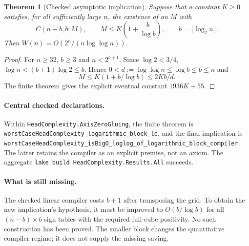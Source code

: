 \documentclass[11pt]{article}
\newtheorem{theorem}{Theorem}
\newcommand{\W}{W}
\begin{document}
\begin{theorem}[Checked asymptotic implication]
Suppose that a constant $K\geq0$ satisfies, for all sufficiently large
$n$, the existence of an $M$ with
\[
 C(n-b,b;M),\qquad
 M\leq K\left(1+\frac{b}{\log b}\right),
 \qquad b=\lfloor\log_2 n\rfloor.
\]
Then $\W(n)=O(2^n/(n\log\log n))$.
\end{theorem}
\begin{proof}
For $n\geq32$, $b\geq3$ and
$n<2^{b+1}$. Since $\log2<3/4$,
$\log n<(b+1)\log2\leq b$. Hence
$0<d:=\log\log n\leq\log b\leq b\leq n$ and
\[
 M\leq K(1+b/\log b)\leq 2Kb/d.
\]
The finite theorem gives the explicit eventual constant $1936K+55$.
\end{proof}

\paragraph{Central checked declarations.}
Within \texttt{HeadComplexity.AxisZeroGluing}, the finite theorem is
\texttt{worstCaseHeadComplexity\_logarithmic\_block\_le}, and the final
implication is
\texttt{worstCaseHeadComplexity\_isBigO\_loglog\_of\_logarithmic\_block\_compiler}.
The latter retains the compiler as an explicit premise, not an axiom.
The aggregate \texttt{lake build HeadComplexity.Results.All} succeeds.

\paragraph{What is still missing.}
The checked linear compiler costs $b+1$ after transposing the grid.
To obtain the new implication's hypothesis, it must be improved to
$O(b/\log b)$ for all $(n-b)\times b$ sign tables with the required
full-cube positivity. No such construction has been proved. The smaller
block changes the quantitative compiler regime; it does not supply
the missing saving.
\end{document}
